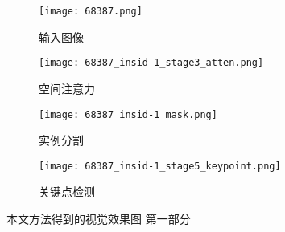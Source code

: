 \begin{figure}[htbp]
\begin{minipage}[t]{\linewidth}
		\vskip5pt
		\begin{subfigure}[b]{0.23\linewidth}
			\texttt{[image: 68387.png]}
			\caption{输入图像}
		\end{subfigure}
		\begin{subfigure}[b]{0.23\linewidth}
			\texttt{[image: 68387\_insid-1\_stage3\_atten.png]}
			\caption{空间注意力}
		\end{subfigure}
		\begin{subfigure}[b]{0.23\linewidth}
			\texttt{[image: 68387\_insid-1\_mask.png]}
			\caption{实例分割}
		\end{subfigure}
		\begin{subfigure}[b]{0.23\linewidth}
			\texttt{[image: 68387\_insid-1\_stage5\_keypoint.png]}
			\caption{关键点检测}
		\end{subfigure}
	\end{minipage}
	\caption{本文方法得到的视觉效果图 第一部分}
	\label{fig:megavis_a}
\end{figure}

